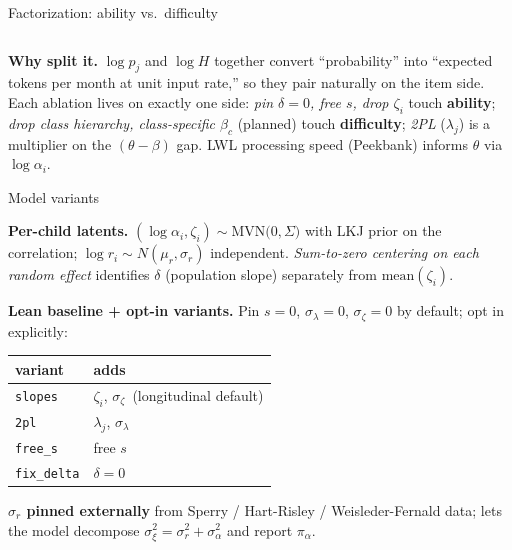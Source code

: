 \documentclass[aspectratio=169,t]{beamer}
\newcommand{\pia}{\pi_{\alpha}}
\newcommand{\sigxi}{\sigma_{\xi}}
\newcommand{\siga}{\sigma_{\alpha}}
\newcommand{\sigr}{\sigma_{r}}
\newcommand{\sigz}{\sigma_{\zeta}}
\newcommand{\siglam}{\sigma_{\lambda}}
\begin{document}
\begin{frame}[fragile]{Factorization: ability vs.\ difficulty}
\begin{columns}[T, onlytextwidth]
\end{columns}

\vspace{0.6em}
\footnotesize
\textbf{Why split it.}  $\log p_j$ and $\log H$ together convert
``probability'' into ``expected tokens per month at unit input rate,''
so they pair naturally on the item side.  Each ablation lives on
exactly one side: \textit{pin $\delta=0$, free $s$, drop $\zeta_i$}
touch \textbf{ability}; \textit{drop class hierarchy, class-specific
$\beta_c$} (planned) touch \textbf{difficulty}; \textit{2PL}
($\lambda_j$) is a multiplier on the $(\theta-\beta)$ gap.  LWL
processing speed (Peekbank) informs $\theta$ via $\log\alpha_i$.

\end{frame}

\begin{frame}{Model variants}

\textbf{Per-child latents.}
$(\log\alpha_i, \zeta_i) \sim \mathrm{MVN}\!\big(0,\Sigma\big)$
with LKJ prior on the correlation; $\log r_i \sim N(\mu_r, \sigr)$
independent. \emph{Sum-to-zero centering on each random effect}
identifies $\delta$ (population slope) separately from
$\mathrm{mean}(\zeta_i)$.

\vspace{0.6em}
\textbf{Lean baseline + opt-in variants.}
Pin $s\!=\!0$, $\siglam\!=\!0$, $\sigz\!=\!0$ by default; opt in
explicitly:

\vspace{0.4em}
\centering
\small
\begin{tabular}{ll}
\toprule
variant & adds \\
\midrule
\texttt{slopes}     & $\zeta_i$, $\sigz$ \,(longitudinal default) \\
\texttt{2pl}        & $\lambda_j$, $\siglam$ \\
\texttt{free\_s}    & free $s$ \\
\texttt{fix\_delta} & $\delta = 0$ \\
\bottomrule
\end{tabular}

\flushleft
\vspace{0.6em}
\textbf{$\sigr$ pinned externally} from Sperry / Hart-Risley /
Weisleder-Fernald data; lets the model decompose
$\sigxi^2 = \sigr^2 + \siga^2$ and report $\pia$.

\end{frame}
\end{document}
